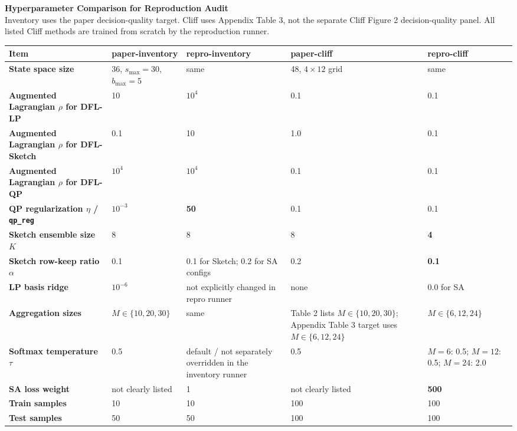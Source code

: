 \documentclass[10pt]{article}
\begin{document}
{\Large \textbf{Hyperparameter Comparison for Reproduction Audit}}\\[3pt]
{\small Inventory uses the paper decision-quality target. Cliff uses Appendix Table 3, not the separate Cliff Figure 2 decision-quality panel. All listed Cliff methods are trained from scratch by the reproduction runner.}\\[8pt]

\scriptsize
\begin{tabularx}{\textwidth}{>{\bfseries\RaggedRight\arraybackslash}p{}YYYY}
\toprule
{}
Item & paper-inventory & repro-inventory & paper-cliff & repro-cliff \\
\midrule
State space size
& 36, $s_{\max}=30$, $b_{\max}=5$
& same
& 48, $4 \times 12$ grid
& same \\

Augmented Lagrangian $\rho$ for DFL-LP
& 10
& $10^4$
& 0.1
& 0.1 \\

Augmented Lagrangian $\rho$ for DFL-Sketch
& 0.1
& 10
& 1.0
& 0.1 \\

Augmented Lagrangian $\rho$ for DFL-QP
& $10^4$
& $10^4$
& 0.1
& 0.1 \\

QP regularization $\eta$ / \texttt{qp\_reg}
& $10^{-3}$
& \textbf{50}
& 0.1
& 0.1 \\

Sketch ensemble size $K$
& 8
& 8
& 8
& \textbf{4} \\

Sketch row-keep ratio $\alpha$
& 0.1
& 0.1 for Sketch; 0.2 for SA configs
& 0.2
& \textbf{0.1} \\

LP basis ridge
& $10^{-6}$
& not explicitly changed in repro runner
& none
& 0.0 for SA \\

Aggregation sizes
& $M \in \{10,20,30\}$
& same
& Table 2 lists $M \in \{10,20,30\}$; Appendix Table 3 target uses $M \in \{6,12,24\}$
& $M \in \{6,12,24\}$ \\

Softmax temperature $\tau$
& 0.5
& default / not separately overridden in the inventory runner
& 0.5
& $M=6$: 0.5; $M=12$: 0.5; $M=24$: 2.0 \\

SA loss weight
& not clearly listed
& 1
& not clearly listed
& \textbf{500} \\

Train samples
& 10
& 10
& 100
& 100 \\

Test samples
& 50
& 50
& 100
& 100 \\
\bottomrule
\end{tabularx}
\end{document}
